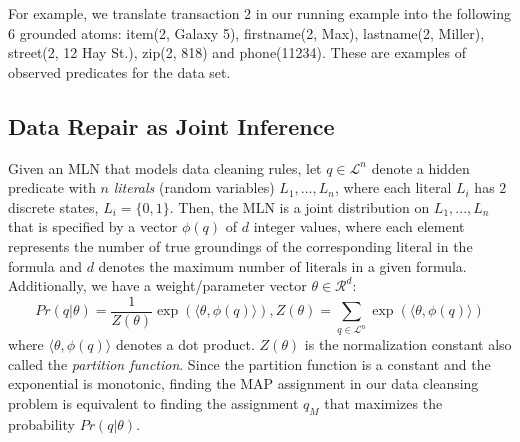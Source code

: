 For example, we translate transaction 2 in our running example into the following 6 grounded atoms: \textsf{item}(2, Galaxy 5), \textsf{firstname}(2, Max), \textsf{lastname}(2, Miller), \textsf{street}(2, 12 Hay St.), \textsf{zip}(2, 818) and \textsf{phone}(11234). These are examples of observed predicates for the data set. 

\subsection{Data Repair as Joint Inference}

 Given an MLN that models data cleaning rules, let $q \in \mathcal{L}^n$ denote a hidden predicate with $n$ \emph{literals} (random variables) $L_1,...,L_n$, where each literal $L_i$
has $2$ discrete states, $L_i = \lbrace 0,1 \rbrace$.
Then, the MLN is a joint distribution on  $L_1,...,L_n$ that 
is specified by a vector $\phi(q)$ of $d$ integer values, where
each element represents the number of true groundings of the 
corresponding literal in the formula and $d$ denotes the 
maximum number of literals in a given formula. Additionally, 
we have a weight/parameter vector $\theta \in \mathcal{R}^d$:
\begin{equation*}
Pr \left( q | \theta \right) = 
\frac{1}{Z(\theta)} \exp\left( \langle \theta, \phi(q) \rangle  \right), 
Z(\theta) = \sum_{q \in \mathcal{L}^n}\exp\left( \langle \theta, \phi(q) \rangle  \right) 
\end{equation*}
where $\langle \theta, \phi(q) \rangle$ denotes a dot product. 
$Z(\theta)$ is the normalization constant also called the 
\emph{partition function}. Since the partition function is a constant and the exponential is monotonic, finding the MAP assignment in our data cleansing problem is equivalent to finding the assignment $q_M$ that maximizes the probability $Pr \left( q | \theta \right)$.

